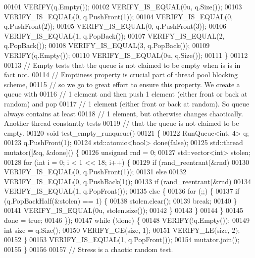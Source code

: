 \begin{DoxyCode}
00101   VERIFY(q.Empty());
00102   VERIFY\_IS\_EQUAL(0u, q.Size());
00103   VERIFY\_IS\_EQUAL(0, q.PushFront(1));
00104   VERIFY\_IS\_EQUAL(0, q.PushFront(2));
00105   VERIFY\_IS\_EQUAL(0, q.PushFront(3));
00106   VERIFY\_IS\_EQUAL(1, q.PopBack());
00107   VERIFY\_IS\_EQUAL(2, q.PopBack());
00108   VERIFY\_IS\_EQUAL(3, q.PopBack());
00109   VERIFY(q.Empty());
00110   VERIFY\_IS\_EQUAL(0u, q.Size());
00111 \}
00112 
00113 \textcolor{comment}{// Empty tests that the queue is not claimed to be empty when is is in fact not.}
00114 \textcolor{comment}{// Emptiness property is crucial part of thread pool blocking scheme,}
00115 \textcolor{comment}{// so we go to great effort to ensure this property. We create a queue with}
00116 \textcolor{comment}{// 1 element and then push 1 element (either front or back at random) and pop}
00117 \textcolor{comment}{// 1 element (either front or back at random). So queue always contains at least}
00118 \textcolor{comment}{// 1 element, but otherwise changes chaotically. Another thread constantly tests}
00119 \textcolor{comment}{// that the queue is not claimed to be empty.}
00120 \textcolor{keywordtype}{void} test\_empty\_runqueue()
00121 \{
00122   RunQueue<int, 4> q;
00123   q.PushFront(1);
00124   std::atomic<bool> done(\textcolor{keyword}{false});
00125   std::thread mutator([&q, &done]() \{
00126     \textcolor{keywordtype}{unsigned} rnd = 0;
00127     std::vector<int> stolen;
00128     \textcolor{keywordflow}{for} (\textcolor{keywordtype}{int} i = 0; i < 1 << 18; i++) \{
00129       \textcolor{keywordflow}{if} (rand\_reentrant(&rnd) %
00130         VERIFY\_IS\_EQUAL(0, q.PushFront(1));
00131       \textcolor{keywordflow}{else}
00132         VERIFY\_IS\_EQUAL(0, q.PushBack(1));
00133       \textcolor{keywordflow}{if} (rand\_reentrant(&rnd) %
00134         VERIFY\_IS\_EQUAL(1, q.PopFront());
00135       \textcolor{keywordflow}{else} \{
00136         \textcolor{keywordflow}{for} (;;) \{
00137           \textcolor{keywordflow}{if} (q.PopBackHalf(&stolen) == 1) \{
00138             stolen.clear();
00139             \textcolor{keywordflow}{break};
00140           \}
00141           VERIFY\_IS\_EQUAL(0u, stolen.size());
00142         \}
00143       \}
00144     \}
00145     done = \textcolor{keyword}{true};
00146   \});
00147   \textcolor{keywordflow}{while} (!done) \{
00148     VERIFY(!q.Empty());
00149     \textcolor{keywordtype}{int} size = q.Size();
00150     VERIFY\_GE(size, 1);
00151     VERIFY\_LE(size, 2);
00152   \}
00153   VERIFY\_IS\_EQUAL(1, q.PopFront());
00154   mutator.join();
00155 \}
00156 
00157 \textcolor{comment}{// Stress is a chaotic random test.}

\end{DoxyCode}

